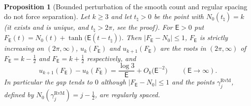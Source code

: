 \documentclass[11pt,a4paper]{article}
\numberwithin{equation}{section}
\newtheorem{proposition}[theorem]{Proposition}
\theoremstyle{definition}
\theoremstyle{remark}
\begin{document}
\begin{proposition}[Bounded perturbation of the smooth count and regular spacing do not force separation]\label{prop:v16-counter}
Let $k\ge3$ and let $t_\natural>0$ be the point with $N_0(t_\natural)=k$ (it exists and is unique, and $t_\natural>2\pi$, see the proof). For $\mathsf E>0$ put $F_{\mathsf E}(t)=N_0(t)+\tanh\bigl(\mathsf E(t-t_\natural)\bigr)$. Then $|F_{\mathsf E}-N_0|\le1$, $F_{\mathsf E}$ is strictly increasing on $(2\pi,\infty)$, $u_k(F_{\mathsf E})$ and $u_{k+1}(F_{\mathsf E})$ are the roots in $(2\pi,\infty)$ of $F_{\mathsf E}=k-\tfrac12$ and $F_{\mathsf E}=k+\tfrac12$ respectively, and
\begin{equation}
u_{k+1}(F_{\mathsf E})-u_k(F_{\mathsf E})=\frac{\log3}{\mathsf E}+O_k\!\bigl(\mathsf E^{-2}\bigr)\qquad(\mathsf E\to\infty).
\end{equation}
In particular the gap tends to $0$ although $|F_{\mathsf E}-N_0|\le1$ and the points $\gamma_j^{\mathrm{RvM}}$, defined by $N_0(\gamma_j^{\mathrm{RvM}})=j-\frac12$, are regularly spaced.
\end{proposition}
\end{document}

